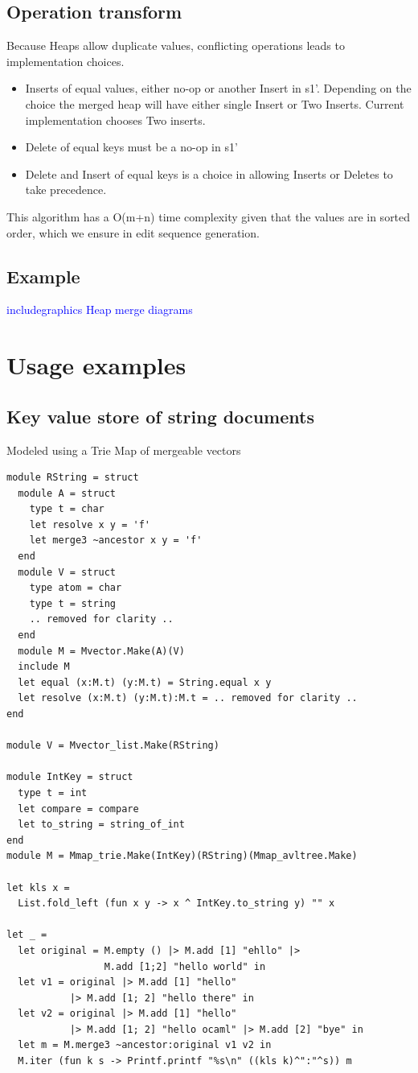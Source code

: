 \documentclass{article}
\newcommand{\mytodo}[1]{\textcolor{blue}{#1}}
\begin{document}
\subsection{Operation transform}
Because Heaps allow duplicate values, conflicting operations leads to implementation choices.
\begin{itemize}
\item Inserts of equal values, either no-op or another Insert in s1'. Depending on the choice the merged heap will have either single Insert or Two Inserts. Current implementation chooses Two inserts.
\item Delete of equal keys must be a no-op in s1'
\item Delete and Insert of equal keys is a choice in allowing Inserts or Deletes to take precedence.
\end{itemize}
This algorithm has a O(m+n) time complexity given that the values are in sorted order, which we ensure in edit sequence generation.
\subsection{Example}
\mytodo{includegraphics Heap merge diagrams}

\newpage
\section{Usage examples}
\subsection{Key value store of string documents}
Modeled using a Trie Map of mergeable vectors
\begin{lstlisting}
module RString = struct
  module A = struct
    type t = char
    let resolve x y = 'f'
    let merge3 ~ancestor x y = 'f'
  end
  module V = struct
    type atom = char
    type t = string
    .. removed for clarity ..
  end
  module M = Mvector.Make(A)(V)
  include M
  let equal (x:M.t) (y:M.t) = String.equal x y
  let resolve (x:M.t) (y:M.t):M.t = .. removed for clarity ..
end

module V = Mvector_list.Make(RString)

module IntKey = struct
  type t = int 
  let compare = compare
  let to_string = string_of_int
end
module M = Mmap_trie.Make(IntKey)(RString)(Mmap_avltree.Make)

let kls x = 
  List.fold_left (fun x y -> x ^ IntKey.to_string y) "" x

let _ =
  let original = M.empty () |> M.add [1] "ehllo" |> 
                 M.add [1;2] "hello world" in
  let v1 = original |> M.add [1] "hello" 
           |> M.add [1; 2] "hello there" in
  let v2 = original |> M.add [1] "hello" 
           |> M.add [1; 2] "hello ocaml" |> M.add [2] "bye" in
  let m = M.merge3 ~ancestor:original v1 v2 in
  M.iter (fun k s -> Printf.printf "%s\n" ((kls k)^":"^s)) m
\end{lstlisting}
\end{document}

